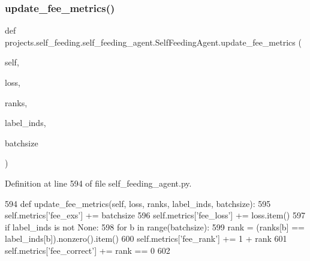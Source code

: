 \subsubsection{\texorpdfstring{update\+\_\+fee\+\_\+metrics()}{update\_fee\_metrics()}}
{\footnotesize\ttfamily def projects.\+self\+\_\+feeding.\+self\+\_\+feeding\+\_\+agent.\+Self\+Feeding\+Agent.\+update\+\_\+fee\+\_\+metrics (\begin{DoxyParamCaption}\item[{}]{self,  }\item[{}]{loss,  }\item[{}]{ranks,  }\item[{}]{label\+\_\+inds,  }\item[{}]{batchsize }\end{DoxyParamCaption})}



Definition at line 594 of file self\+\_\+feeding\+\_\+agent.\+py.


\begin{DoxyCode}
594     \textcolor{keyword}{def }update\_fee\_metrics(self, loss, ranks, label\_inds, batchsize):
595         self.metrics[\textcolor{stringliteral}{'fee\_exs'}] += batchsize
596         self.metrics[\textcolor{stringliteral}{'fee\_loss'}] += loss.item()
597         \textcolor{keywordflow}{if} label\_inds \textcolor{keywordflow}{is} \textcolor{keywordflow}{not} \textcolor{keywordtype}{None}:
598             \textcolor{keywordflow}{for} b \textcolor{keywordflow}{in} range(batchsize):
599                 rank = (ranks[b] == label\_inds[b]).nonzero().item()
600                 self.metrics[\textcolor{stringliteral}{'fee\_rank'}] += 1 + rank
601                 self.metrics[\textcolor{stringliteral}{'fee\_correct'}] += rank == 0
602 
\end{DoxyCode}
\mbox{\label{classprojects_1_1self__feeding_1_1self__feeding__agent_1_1SelfFeedingAgent_ab41a6e0b9f7ba0163ebb1152eadfdeb1}} 
